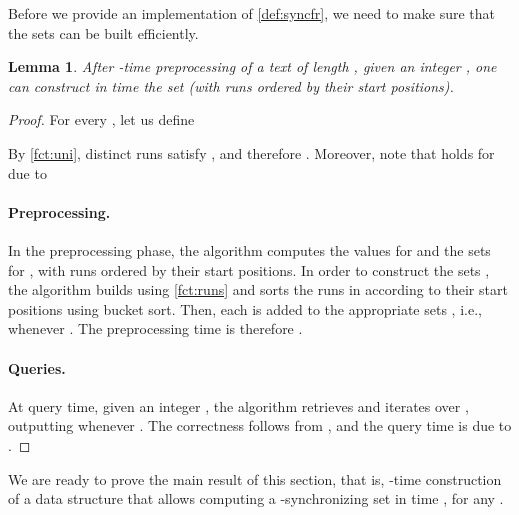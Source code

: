 \documentclass[a4paper]{article}
\newtheorem{lemma}[theorem]{Lemma}
\theoremstyle{definition}
\theoremstyle{remark}
\begin{document}
Before we provide an implementation of \cref{def:syncfr}, we need to make sure that the sets  can be built efficiently.
\begin{lemma}\label{lem:tauruns}
  After -time preprocessing of a text  of length ,
  given an integer , 
  one can construct in  time the set  (with runs ordered by their start positions). 
\end{lemma}
\begin{proof}
  For every , let us define 
  
  By \cref{fct:uni}, distinct runs  satisfy ,
  and therefore .
  Moreover, note that  holds for  due to
  
 
  \paragraph{\bf Preprocessing.}  In the preprocessing phase, the algorithm computes the values  for 
  and the sets  for ,
  with runs ordered by their start positions.
  In order to construct the sets , the algorithm builds  using \cref{fct:runs}
  and sorts the runs in  according to their start positions using bucket sort.
  Then, each  is added to the appropriate sets ,
  i.e., whenever .
  The preprocessing time is therefore .
\paragraph{\bf Queries.}  At query time, given an integer , the algorithm retrieves 
  and iterates over , outputting  whenever .
  The correctness follows from  , and the query time is  due to .
\end{proof}

We are ready to prove the main result of this section, that is, -time construction of a data structure that allows computing
a -synchronizing set in time , for any .
\end{document}
